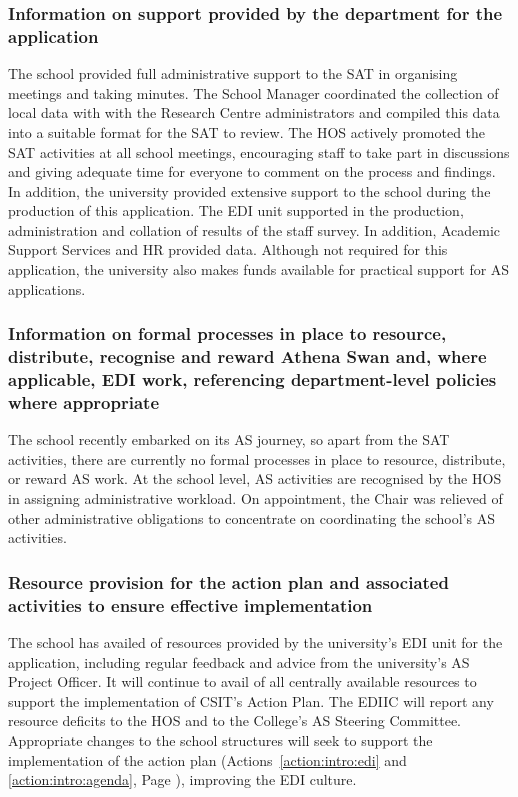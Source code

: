 \subsubsection{Information on support provided by the department for the application}
The school provided full administrative support to the SAT in organising
meetings and taking minutes. The School Manager coordinated the
collection of local data with with the Research Centre administrators
and  compiled this data into a suitable format for the SAT to review.
The \ac{HOS} actively promoted the SAT activities at all school meetings,
encouraging staff to take part in discussions and giving adequate
time for everyone to comment on the process and findings.
In addition, the university provided extensive support to the school during the production of this application. The EDI unit supported in the production, administration and collation of results of the staff survey. In addition, Academic Support Services and HR provided data. Although not required for this application, the university also makes funds available for practical support for AS applications.   


\subsubsection{Information on formal processes in place to resource, distribute, recognise and reward Athena Swan and, where applicable, EDI work, referencing department-level policies where appropriate}

The school recently embarked on its AS journey, so apart from the SAT activities, there are currently no formal processes in place to  resource, distribute, or reward AS work.
At the school level, AS activities are recognised by the \ac{HOS} in assigning administrative workload. On appointment, the Chair was relieved of other administrative obligations to concentrate on coordinating the school's AS activities. 


\subsubsection{Resource provision for the action plan and associated activities to ensure effective implementation}

The school has availed of resources provided by the university's EDI unit for the application, including regular feedback and advice from the university's \ac{AS} Project Officer. It will continue to avail of all centrally available resources to support the implementation of CSIT's Action Plan. The \ac{EDIIC} will report any resource deficits to the \ac{HOS} and to the College's AS Steering Committee.
Appropriate changes to the school structures will seek to support the implementation of the action plan (Actions~\ref{action:intro:edi} and \ref{action:intro:agenda}, Page \pageref{action:intro:edi}),  improving the EDI culture.



